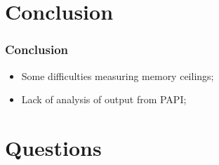 \documentclass{beamer}
\begin{document}

\section{Conclusion}
\begin{frame}
	\frametitle{Conclusion}
	\begin{itemize}
		\item Some difficulties measuring memory ceilings;
		\item Lack of analysis of output from PAPI;
	\end{itemize}
\end{frame}

\section{Questions}
\begin{frame}
	\titlepage
	
	
\end{frame}
\end{document}
